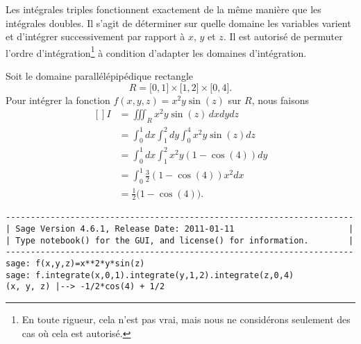 Les intégrales triples fonctionnent exactement de la même manière que les intégrales doubles. Il s'agit de déterminer sur quelle domaine les variables varient et d'intégrer successivement par rapport à $x$, $y$ et $z$. Il est autorisé de permuter l'ordre d'intégration\footnote{En toute rigueur, cela n'est pas vrai, mais nous ne considérons seulement des cas où cela est autorisé.} à condition d'adapter les domaines d'intégration.

\begin{example}
    Soit le domaine parallélépipédique rectangle
    \begin{equation}
        R=\mathopen[ 0 , 1 \mathclose]\times \mathopen[ 1 , 2 \mathclose]\times\mathopen[ 0 , 4 \mathclose].
    \end{equation}
    Pour intégrer la fonction $f(x,y,z)=x^2y\sin(z)$ sur $R$, nous faisons
    \begin{equation}
        \begin{aligned}[]
            I&=\iiint_Rx^2y\sin(z)\,dxdydz\\
            &=\int_0^1dx\int_1^2dy\int_0^4x^2y\sin(z)dz\\
            &=\int_0^1dx\int_1^2 x^2y(1-\cos(4))dy\\
            &=\int_0^1\frac{ 3 }{2}(1-\cos(4))x^2dx\\
            &=\frac{ 1 }{2}\big( 1-\cos(4) \big).
        \end{aligned}
    \end{equation}

    \begin{verbatim}
----------------------------------------------------------------------
| Sage Version 4.6.1, Release Date: 2011-01-11                       |
| Type notebook() for the GUI, and license() for information.        |
----------------------------------------------------------------------
sage: f(x,y,z)=x**2*y*sin(z)
sage: f.integrate(x,0,1).integrate(y,1,2).integrate(z,0,4)
(x, y, z) |--> -1/2*cos(4) + 1/2
    \end{verbatim}
\end{example}


